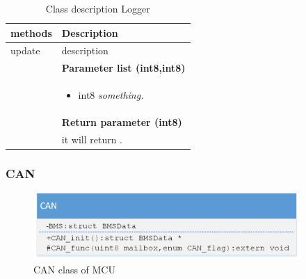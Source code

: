 \begin{table}[H]
	\centering
	\begin{tabular}{|p{5 cm}|p{10 cm}|}
		\hline
		\textbf{methods} & \textbf{Description} \\ \hline
		
		update
		& description
		\\ & \textbf{Parameter list (int8,int8)}
		\\ & \begin{itemize}
			\item {\large int8}
			\subitem \textit{something.}
		\end{itemize}
		\\ & \textbf{Return parameter (int8)}
		\\ & it will return .
		\\ \hline
		
	\end{tabular}
	\caption{Class description Logger}
	\label{table:Class_description_Logger_MCU}
\end{table}


\subsubsection{CAN}

\begin{figure}[H]
	\centering
	\includegraphics [width=4in]{Software/Pictures/class-diagram-CAN.png}
	\caption{CAN class of MCU}
	\label{fig:Class_diagram_MCU_CAN}
\end{figure}


